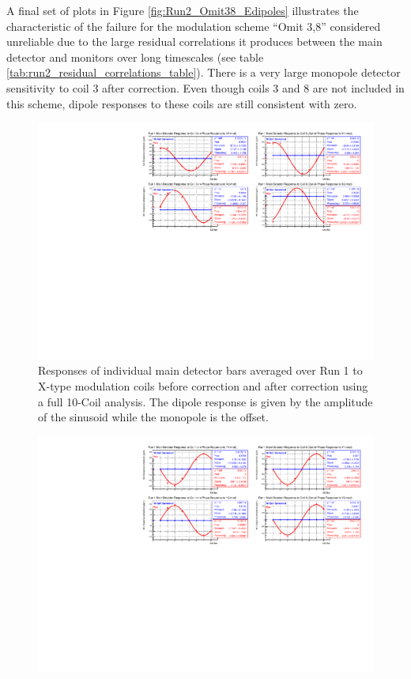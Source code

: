 A final set of plots in Figure \ref{fig:Run2_Omit38_Edipoles} illustrates the characteristic of the failure for the modulation scheme ``Omit 3,8'' considered unreliable due to the large residual correlations it produces between the main detector and monitors over long timescales (see table \ref{tab:run2_residual_correlations_table}). There is a very large monopole detector sensitivity to coil 3 after correction. Even though coils 3 and 8 are not included in this scheme, dipole responses to these coils are still consistent with zero.


\begin{landscape}
\begin{figure}[!ht]
\begin{center}
\includegraphics[width=9in]{./Pictures/Run1_X_dipole10-Coil.pdf}
\caption{\label{fig:Run1_10coil_Xdipoles}Responses of individual main detector bars averaged over Run 1 to X-type modulation coils before correction and after correction using a full 10-Coil analysis. The dipole response is given by the amplitude of the sinusoid while the monopole is the offset.}
\end{center}
\end{figure}
\begin{figure}[!ht]
\begin{center}
\includegraphics[width=9in]{./Pictures/Run1_Y_dipole10-Coil.pdf}

\end{center}
\end{figure}
\end{landscape}
